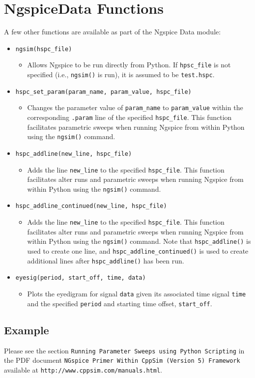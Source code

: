 \documentclass [dvips,12pt]{article}
\newcommand{\bi}{\begin{itemize}}
\newcommand{\ei}{\end{itemize}}
\begin{document}
\section*{NgspiceData Functions}

A few other functions are available as part of the Ngspice Data module:
\bi
\item \verb|ngsim(hspc_file)|
  \bi
    \item Allows Ngspice to be run directly from Python.  If
      \verb|hpsc_file| is not specified (i.e., \verb|ngsim()| is run),
      it is assumed to be \verb|test.hspc|.  
  \ei 
\item \verb|hspc_set_param(param_name, param_value, hspc_file)|
  \bi
    \item  Changes the parameter value of \verb|param_name| to \verb|param_value| within
           the corresponding \verb|.param| line of the specified \verb|hspc_file|. This 
           function facilitates parametric sweeps when running Ngspice from within Python
            using the \verb|ngsim()| command. 
  \ei
\item \verb|hspc_addline(new_line, hspc_file)|
  \bi
    \item  Adds the line \verb|new_line| to the specified \verb|hspc_file|. This 
           function facilitates alter runs and parametric sweeps when 
            running Ngspice from within Python
            using the \verb|ngsim()| command. 
  \ei
\item \verb|hspc_addline_continued(new_line, hspc_file)|
  \bi
    \item  Adds the line \verb|new_line| to the specified \verb|hspc_file|. This 
           function facilitates alter runs and parametric sweeps when 
            running Ngspice from within Python
            using the \verb|ngsim()| command. Note that \verb|hspc_addline()| is used
            to create one line, and \verb|hspc_addline_continued()| is used to create
            additional lines after  \verb|hspc_addline()| has been run.
  \ei
\item \verb|eyesig(period, start_off, time, data)|
  \bi
    \item  Plots the eyedigram for signal \verb|data| given its associated time
           signal \verb|time| and the specified \verb|period| and starting time offset,
           \verb|start_off|.
  \ei

\ei

\subsection*{Example}

Please see the section \verb|Running Parameter Sweeps using Python Scripting| in
the PDF document \verb|NGspice Primer Within CppSim (Version 5) Framework| available at
\verb|http://www.cppsim.com/manuals.html|.
\end{document}
